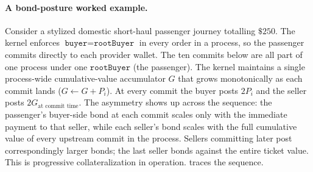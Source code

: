 \documentclass[11pt,a4paper]{article}
\theoremstyle{definition}
\theoremstyle{remark}
\begin{document}
\paragraph{A bond-posture worked example.}
Consider a stylized domestic short-haul passenger journey
totalling $\$250$. The kernel enforces $\texttt{buyer} =
\texttt{rootBuyer}$ in every order in a process, so the passenger
commits directly to each provider wallet. The ten commits below
are all part of one process under one $\texttt{rootBuyer}$ (the
passenger). The kernel maintains a single process-wide
cumulative-value accumulator $G$ that grows monotonically as each
commit lands ($G \leftarrow G + P_i$). At every commit the buyer
posts $2P_i$ and the seller posts $2G_{\text{at commit time}}$.
The asymmetry shows up across the sequence: the passenger's
buyer-side bond at each commit scales only with the immediate
payment to that seller, while each seller's bond scales with the
full cumulative value of every upstream commit in the process.
Sellers committing later post correspondingly larger bonds; the
last seller bonds against the entire ticket value. This is
progressive collateralization in operation.
 traces the sequence.
\end{document}
